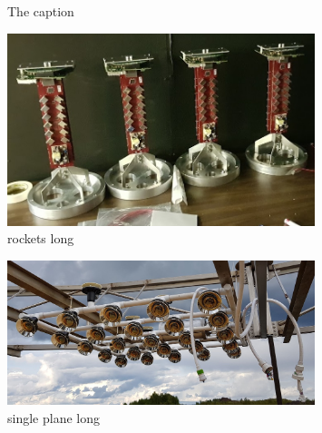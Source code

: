 \begin{figure}[htp]
    \centering
    \quad
    \caption{The caption}
\end{figure}

\begin{figure}
    \includegraphics[width=0.8\textwidth]{diagrams/5-daq/rockets.jpg}
    \caption[rockets short]{rockets long}
    \label{fig:rockets}
\end{figure}

\begin{figure}
    \includegraphics[width=0.8\textwidth]{diagrams/5-daq/single_plane.jpg}
    \caption[single plane short]{single plane long}
    \label{fig:single_plane}
\end{figure}

